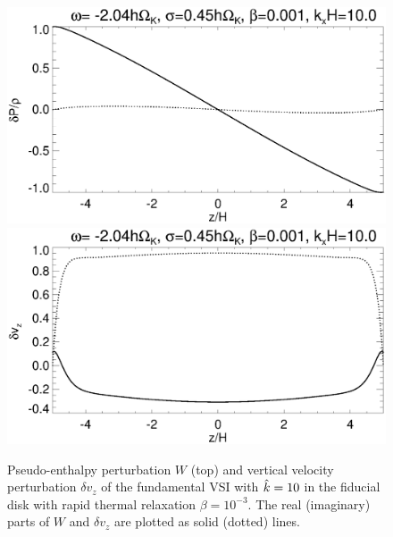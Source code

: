 \begin{figure}
  \includegraphics[width=\linewidth,clip=true,trim=0cm 1.75cm 0cm
  0cm]{figures/eigenvectorW_iso} 
  \includegraphics[width=\linewidth,clip=true,trim=0cm 0cm 0cm
  1cm]{figures/eigenvectorvz_iso}
  \caption{Pseudo-enthalpy perturbation $W$ (top) and vertical velocity
    perturbation $\delta v_z$ of the fundamental VSI with 
    $\hat{k}=10$ in the fiducial disk with rapid thermal relaxation $\beta=10^{-3}$. The real  
    (imaginary) parts of $W$ and $\delta v_z$ are plotted as solid 
    (dotted) lines.
    \label{lowfreq_eigenfunc}
  }
\end{figure}

